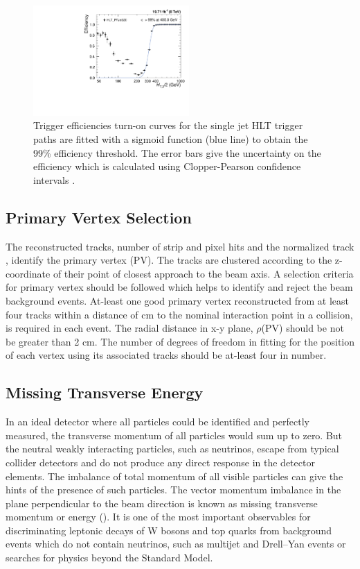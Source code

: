 \begin{figure}[!htbp]
\begin{center}
 \includegraphics[width=0.53\textwidth]{Plots_HT_2_150/Fit_Turn_Efficiency_320_2_ht_2.pdf}
 \caption[Trigger efficiencies turn-on curves for the single jet HLT trigger paths.]{Trigger efficiencies turn-on curves for the single jet HLT trigger paths are fitted with a sigmoid function (blue line) to obtain the 99\% efficiency threshold. The error bars give the uncertainty on the efficiency which is calculated using Clopper-Pearson confidence intervals \cite{10.2307/2331986}.}
 \label{fig:trig_eff}
 \end{center}
\end{figure}

\subsection{Primary Vertex Selection}
The reconstructed tracks, number of strip and pixel hits and the normalized track \chisq, identify the primary vertex (PV). The tracks are clustered according to the z-coordinate of their point of closest approach to the beam axis. A selection criteria for primary vertex should be followed which helps to identify and reject the beam background events. At-least one good primary vertex reconstructed from at least four tracks within a distance of  cm to the nominal interaction point in a collision, is required in each event. The radial distance in x-y plane, $\rho$(PV) should be not be greater than 2 cm. The number of degrees of freedom in fitting for the position of each vertex using its associated tracks should be at-least four in number. 

\subsection{Missing Transverse Energy}
In an ideal detector where all particles could be identified and perfectly measured, the transverse momentum of all particles would sum up to zero. But the neutral weakly interacting particles, such as neutrinos, escape from typical collider detectors and do not produce any direct response in the detector elements. The imbalance of total momentum of all visible particles can give the hints of the presence of such particles. The vector momentum imbalance in the plane perpendicular to the beam direction is known as missing transverse momentum or energy (\ETmiss). It is one of the most important observables for discriminating leptonic decays of W bosons and top quarks from background events which do not contain neutrinos, such as multijet and Drell–Yan events or searches for physics beyond the Standard Model.

